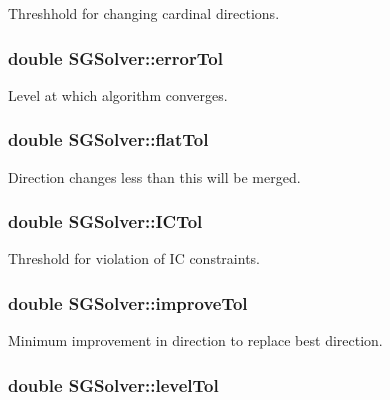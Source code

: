 Threshhold for changing cardinal directions. \hypertarget{class_s_g_solver_a99002245a75f22ec160c47423001ab8a}{
\subsubsection[{error\+Tol}]{\setlength{\rightskip}{0pt plus 5cm}double S\+G\+Solver\+::error\+Tol\hspace{0.3cm}{\ttfamily [private]}}}\label{class_s_g_solver_a99002245a75f22ec160c47423001ab8a}
Level at which algorithm converges. \hypertarget{class_s_g_solver_ae0fa0fb7546a55acbf743d2ab078f2fe}{
\subsubsection[{flat\+Tol}]{\setlength{\rightskip}{0pt plus 5cm}double S\+G\+Solver\+::flat\+Tol\hspace{0.3cm}{\ttfamily [private]}}}\label{class_s_g_solver_ae0fa0fb7546a55acbf743d2ab078f2fe}
Direction changes less than this will be merged. \hypertarget{class_s_g_solver_a127cdfd93f11f83ae3a08342a0dc8ca3}{
\subsubsection[{I\+C\+Tol}]{\setlength{\rightskip}{0pt plus 5cm}double S\+G\+Solver\+::\+I\+C\+Tol\hspace{0.3cm}{\ttfamily [private]}}}\label{class_s_g_solver_a127cdfd93f11f83ae3a08342a0dc8ca3}
Threshold for violation of I\+C constraints. \hypertarget{class_s_g_solver_ae71928b4061d7b054f7051c91fd16a14}{
\subsubsection[{improve\+Tol}]{\setlength{\rightskip}{0pt plus 5cm}double S\+G\+Solver\+::improve\+Tol\hspace{0.3cm}{\ttfamily [private]}}}\label{class_s_g_solver_ae71928b4061d7b054f7051c91fd16a14}
Minimum improvement in direction to replace best direction. \hypertarget{class_s_g_solver_a7e4e10386d8b8256f9fed6b6d2fa75de}{
\subsubsection[{level\+Tol}]{\setlength{\rightskip}{0pt plus 5cm}double S\+G\+Solver\+::level\+Tol\hspace{0.3cm}{\ttfamily [private]}}}\label{class_s_g_solver_a7e4e10386d8b8256f9fed6b6d2fa75de}
